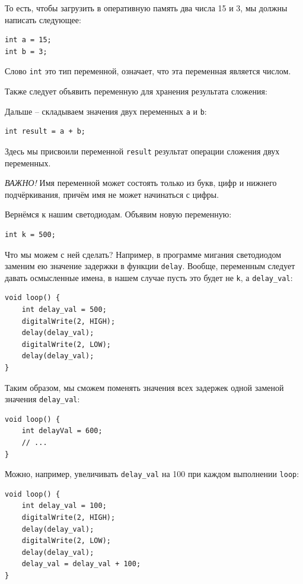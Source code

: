 \documentclass[a4paper,twoside]{book}
\begin{document}
То есть, чтобы загрузить в оперативную память два числа 15 и 3, мы должны написать
следующее:

\begin{verbatim}
int a = 15;
int b = 3;
\end{verbatim}

Слово \texttt{int} это тип переменной, означает, что эта переменная является
числом.

Также следует объявить переменную для хранения результата сложения:

Дальше -- складываем значения двух переменных \texttt{a} и \texttt{b}:

\begin{verbatim}
int result = a + b;
\end{verbatim}

Здесь мы присвоили переменной \texttt{result} результат операции сложения двух
переменных.

\emph{ВАЖНО!} Имя переменной может состоять только из букв, цифр и нижнего
подчёркивания, причём имя не может начинаться с цифры.

Вернёмся к нашим светодиодам. Объявим новую переменную:

\begin{verbatim}
int k = 500;
\end{verbatim}

Что мы можем с ней сделать? Например, в программе мигания светодиодом заменим ею
значение задержки в функции \texttt{delay}. Вообще, переменным следует давать
осмысленные имена, в нашем случае пусть это будет не \texttt{k}, а
\texttt{delay\_val}:

\begin{verbatim}
void loop() {
    int delay_val = 500;
    digitalWrite(2, HIGH);
    delay(delay_val);
    digitalWrite(2, LOW);
    delay(delay_val);
}
\end{verbatim}

Таким образом, мы сможем поменять значения всех задержек одной заменой значения
\texttt{delay\_val}:

\begin{verbatim}
void loop() {
    int delayVal = 600;
    // ...
}
\end{verbatim}

Можно, например, увеличивать \texttt{delay\_val} на 100 при каждом выполнении
\texttt{loop}:

\begin{verbatim}
void loop() {
    int delay_val = 100;
    digitalWrite(2, HIGH);
    delay(delay_val);
    digitalWrite(2, LOW);
    delay(delay_val);
    delay_val = delay_val + 100;
}
\end{verbatim}
\end{document}
